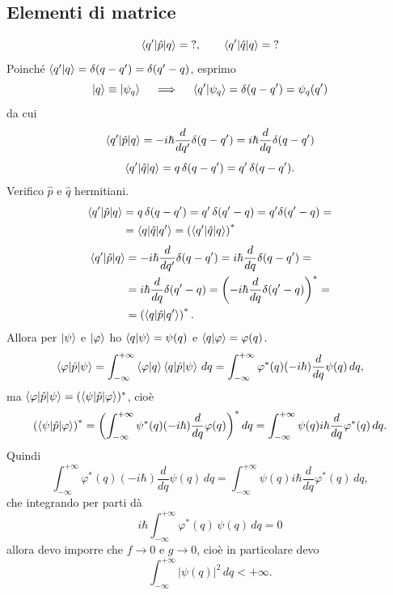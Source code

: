 \subsection{Elementi di matrice}
\[
\braket{q^\prime|\hat{p}|q} = \text{?}, \qquad \braket{q^\prime|\hat{q}|q} = \text{?}
\]
Poinché \( \braket{q^\prime|q} = \delta(q - q^\prime) = \delta(q^\prime - q) \), esprimo
\[
\ket{q} \equiv \ket{\psi_q} \quad \implies \quad \braket{q^\prime|\psi_q} = \delta(q - q^\prime) = \psi_q(q^\prime)
\]
da cui
\[
\braket{q^\prime|\hat{p}|q} = -i \hbar \frac{d}{dq^\prime} \delta(q - q^\prime) = i \hbar \frac{d}{dq} \delta(q - q^\prime)
\]
\[
\braket{q^\prime|\hat{q}|q} = q \, \delta(q - q^\prime) = q^\prime \, \delta(q - q^\prime).
\]
Verifico \( \hat{p} \) e \( \hat{q} \) hermitiani.
\begin{align*}
\braket{q^\prime|\hat{p}|q} &= q \, \delta(q - q^\prime) = q^\prime \, \delta(q^\prime - q) = q^\prime \delta(q^\prime - q) = \\
&= \braket{q|\hat{q}|q^\prime} = \left( \braket{q^\prime|\hat{q}|q} \right)^*
\end{align*}
\begin{align*}
\braket{q^\prime|\hat{p}|q} &= -i \hbar \frac{d}{dq^\prime} \delta(q - q^\prime) = i \hbar \frac{d}{dq} \delta(q - q^\prime) = \\
&= i \hbar \frac{d}{dq} \delta(q^\prime - q) = \left( -i \hbar \frac{d}{dq} \delta(q^\prime - q) \right)^* = \\
&= \left( \braket{q|\hat{p}|q^\prime} \right)^*.
\end{align*}
Allora per \( \ket{\psi} \) e \( \ket{\varphi} \) ho \( \braket{q|\psi} = \psi(q) \) e \( \braket{q|\varphi} = \varphi(q) \).
\[
\braket{\varphi|\hat{p}|\psi} = \int_{-\infty}^{+\infty} \braket{\varphi|q} \braket{q|\hat{p}|\psi} \, dq = \int_{-\infty}^{+\infty} \varphi^*(q) (-i \hbar) \frac{d}{dq} \psi(q) \, dq,
\]
ma \( \braket{\varphi|\hat{p}|\psi} = (\braket{\psi|\hat{p}|\varphi})^* \), cioè
\[
\left( \braket{\psi|\hat{p}|\varphi} \right)^* = \left( \int_{-\infty}^{+\infty} \psi^*(q) (-i \hbar) \frac{d}{dq} \varphi(q) \right)^* dq = \int_{-\infty}^{+\infty} \psi(q) i \hbar \frac{d}{dq} \varphi^*(q) \, dq.
\]
Quindi
\[
\int_{-\infty}^{+\infty} \varphi^*(q) (-i \hbar) \frac{d}{dq} \psi(q) \, dq = \int_{-\infty}^{+\infty} \psi(q) i \hbar \frac{d}{dq} \varphi^*(q) \, dq,
\]
che integrando per parti dà
\[
i \hbar \int_{-\infty}^{+\infty} \varphi^*(q) \, \psi(q) \, dq = 0
\]
allora devo imporre che \( f \rightarrow 0 \) e \( g \rightarrow 0 \), cioè in particolare devo
\[
\int_{-\infty}^{+\infty} \left| \psi(q) \right|^2 \, dq < + \infty.
\]